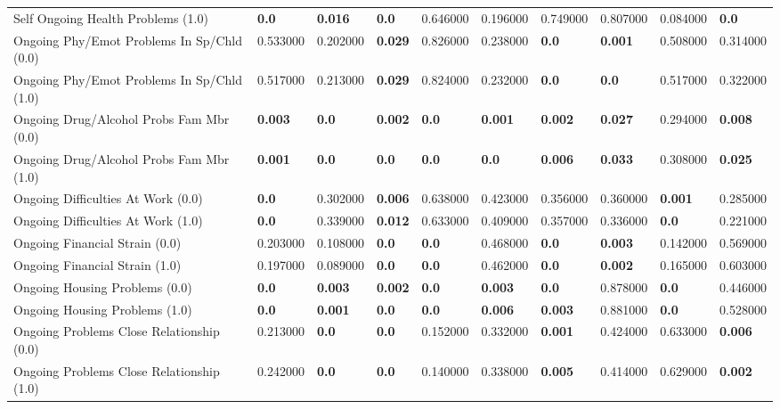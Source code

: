 \begin{tabular}{llllllllll}
Self Ongoing Health Problems (1.0) & \textbf{0.0} & \textbf{0.016} & \textbf{0.0} & 0.646000 & 0.196000 & 0.749000 & 0.807000 & 0.084000 & \textbf{0.0} \\
Ongoing Phy/Emot Problems In Sp/Chld (0.0) & 0.533000 & 0.202000 & \textbf{0.029} & 0.826000 & 0.238000 & \textbf{0.0} & \textbf{0.001} & 0.508000 & 0.314000 \\
Ongoing Phy/Emot Problems In Sp/Chld (1.0) & 0.517000 & 0.213000 & \textbf{0.029} & 0.824000 & 0.232000 & \textbf{0.0} & \textbf{0.0} & 0.517000 & 0.322000 \\
Ongoing Drug/Alcohol Probs Fam Mbr (0.0) & \textbf{0.003} & \textbf{0.0} & \textbf{0.002} & \textbf{0.0} & \textbf{0.001} & \textbf{0.002} & \textbf{0.027} & 0.294000 & \textbf{0.008} \\
Ongoing Drug/Alcohol Probs Fam Mbr (1.0) & \textbf{0.001} & \textbf{0.0} & \textbf{0.0} & \textbf{0.0} & \textbf{0.0} & \textbf{0.006} & \textbf{0.033} & 0.308000 & \textbf{0.025} \\
Ongoing Difficulties At Work (0.0) & \textbf{0.0} & 0.302000 & \textbf{0.006} & 0.638000 & 0.423000 & 0.356000 & 0.360000 & \textbf{0.001} & 0.285000 \\
Ongoing Difficulties At Work (1.0) & \textbf{0.0} & 0.339000 & \textbf{0.012} & 0.633000 & 0.409000 & 0.357000 & 0.336000 & \textbf{0.0} & 0.221000 \\
Ongoing Financial Strain (0.0) & 0.203000 & 0.108000 & \textbf{0.0} & \textbf{0.0} & 0.468000 & \textbf{0.0} & \textbf{0.003} & 0.142000 & 0.569000 \\
Ongoing Financial Strain (1.0) & 0.197000 & 0.089000 & \textbf{0.0} & \textbf{0.0} & 0.462000 & \textbf{0.0} & \textbf{0.002} & 0.165000 & 0.603000 \\
Ongoing Housing Problems (0.0) & \textbf{0.0} & \textbf{0.003} & \textbf{0.002} & \textbf{0.0} & \textbf{0.003} & \textbf{0.0} & 0.878000 & \textbf{0.0} & 0.446000 \\
Ongoing Housing Problems (1.0) & \textbf{0.0} & \textbf{0.001} & \textbf{0.0} & \textbf{0.0} & \textbf{0.006} & \textbf{0.003} & 0.881000 & \textbf{0.0} & 0.528000 \\
Ongoing Problems Close Relationship (0.0) & 0.213000 & \textbf{0.0} & \textbf{0.0} & 0.152000 & 0.332000 & \textbf{0.001} & 0.424000 & 0.633000 & \textbf{0.006} \\
Ongoing Problems Close Relationship (1.0) & 0.242000 & \textbf{0.0} & \textbf{0.0} & 0.140000 & 0.338000 & \textbf{0.005} & 0.414000 & 0.629000 & \textbf{0.002} \\

\end{tabular}

